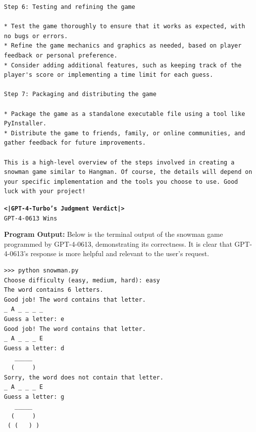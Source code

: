 \documentclass{article}
\begin{document}
\begin{tcolorbox}
\begin{lstlisting}
Step 6: Testing and refining the game

* Test the game thoroughly to ensure that it works as expected, with no bugs or errors.
* Refine the game mechanics and graphics as needed, based on player feedback or personal preference.
* Consider adding additional features, such as keeping track of the player's score or implementing a time limit for each guess.

Step 7: Packaging and distributing the game

* Package the game as a standalone executable file using a tool like PyInstaller.
* Distribute the game to friends, family, or online communities, and gather feedback for future improvements.

This is a high-level overview of the steps involved in creating a snowman game similar to Hangman. Of course, the details will depend on your specific implementation and the tools you choose to use. Good luck with your project!
\end{lstlisting}

\texttt{\textbf{<|GPT-4-Turbo's Judgment Verdict|>}} \\
\texttt{GPT-4-0613 Wins}
\end{tcolorbox}

\textbf{Program Output:} Below is the terminal output of the snowman game programmed by GPT-4-0613, demonstrating its correctness. It is clear that GPT-4-0613's response is more helpful and relevant to the user's request.
\begin{tcolorbox}
\begin{lstlisting}
>>> python snowman.py
Choose difficulty (easy, medium, hard): easy
The word contains 6 letters.
Good job! The word contains that letter.
_ A _ _ _ _
Guess a letter: e
Good job! The word contains that letter.
_ A _ _ _ E
Guess a letter: d
   _____   
  (     )  
Sorry, the word does not contain that letter.
_ A _ _ _ E
Guess a letter: g
   _____   
  (     )  
 ( (   ) ) 
\end{lstlisting}
\end{tcolorbox}
\end{document}

